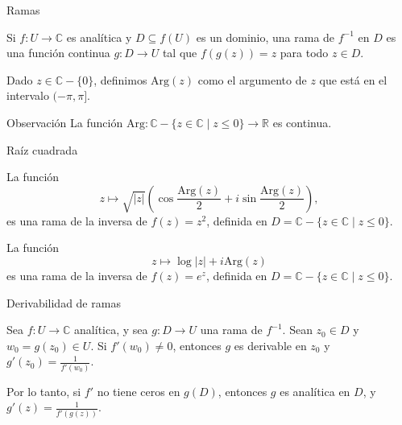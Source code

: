 \documentclass[spanish,presentation]{beamer}
\begin{document}
\begin{frame}[label=sec-3-3]{Ramas}
\begin{definition}
Si \(f\colon U\to \mathbb{C}\) es analítica y \(D\subseteq f(U)\)
es un dominio, una \alert{rama de \(f^{-1}\) en \(D\)} es una función
continua \(g\colon D\to U\) tal que \(f(g(z))=z\) para todo \(z\in
    D\).
\end{definition}

\begin{definition}
Dado \(z\in \mathbb{C}-\{0\}\), definimos
\(\mathrm{Arg}(z)\) como el argumento de \(z\) que está en el
intervalo \((-\pi,\pi]\).
\end{definition}

\begin{block}{Observación}
La función \(\mathrm{Arg}\colon \mathbb{C}-\{z\in \mathbb{C}\mid
    z\leq 0\}\to \mathbb{R}\) es continua.
\end{block}
\end{frame}

\begin{frame}[label=sec-3-4]{Raíz cuadrada}
\begin{example}
La función
\begin{displaymath}
z\mapsto \sqrt{|z|}(\cos \frac{\mathrm{Arg}(z)}{2}+i\sin\frac{\mathrm{Arg}(z)}{2}),
\end{displaymath}
es una rama de la inversa de \(f(z)=z^{2}\), definida en
\(D=\mathbb{C}-\{z\in \mathbb{C}\mid z\leq 0\}\).
\end{example}

\begin{example}
La función 
\begin{displaymath}
z\mapsto \log |z|+i\mathrm{Arg}(z)
\end{displaymath}
es una rama de la inversa de \(f(z)=e^{z}\), definida en
\(D=\mathbb{C}-\{z\in \mathbb{C}\mid z\leq 0\}\).
\end{example}
\end{frame}

\begin{frame}[label=sec-3-5]{Derivabilidad de ramas}
\begin{theorem}
Sea \(f\colon U\to \mathbb{C}\) analítica, y sea \(g\colon D\to
    U\) una rama de \(f^{-1}\). Sean \(z_{0}\in D\) y
\(w_{0}=g(z_{0})\in U\). Si \(f'(w_{0})\ne 0\), entonces \(g\) es
derivable en \(z_{0}\) y \(g'(z_{0})=\frac{1}{f'(w_{0})}\).

Por lo tanto, si \(f'\) no tiene ceros en \(g(D)\), entonces \(g\)
es analítica en \(D\), y \(g'(z)=\frac{1}{f'(g(z))}\).
\end{theorem}
\end{frame}
\end{document}
